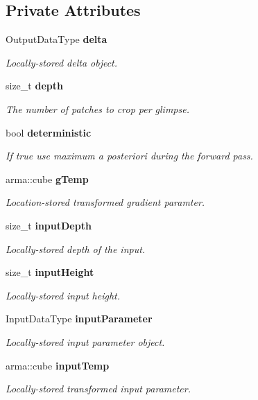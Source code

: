 \subsection*{Private Attributes}
\begin{DoxyCompactItemize}
\item 
Output\+Data\+Type {\bf delta}
\begin{DoxyCompactList}\small\item\em Locally-\/stored delta object. \end{DoxyCompactList}\item 
size\+\_\+t {\bf depth}
\begin{DoxyCompactList}\small\item\em The number of patches to crop per glimpse. \end{DoxyCompactList}\item 
bool {\bf deterministic}
\begin{DoxyCompactList}\small\item\em If true use maximum a posteriori during the forward pass. \end{DoxyCompactList}\item 
arma\+::cube {\bf g\+Temp}
\begin{DoxyCompactList}\small\item\em Location-\/stored transformed gradient paramter. \end{DoxyCompactList}\item 
size\+\_\+t {\bf input\+Depth}
\begin{DoxyCompactList}\small\item\em Locally-\/stored depth of the input. \end{DoxyCompactList}\item 
size\+\_\+t {\bf input\+Height}
\begin{DoxyCompactList}\small\item\em Locally-\/stored input height. \end{DoxyCompactList}\item 
Input\+Data\+Type {\bf input\+Parameter}
\begin{DoxyCompactList}\small\item\em Locally-\/stored input parameter object. \end{DoxyCompactList}\item 
arma\+::cube {\bf input\+Temp}
\begin{DoxyCompactList}\small\item\em Locally-\/stored transformed input parameter. \end{DoxyCompactList}\item 

\end{DoxyCompactItemize}
